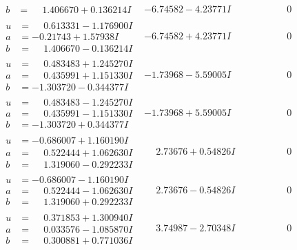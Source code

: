 \documentclass[1p]{elsarticle_modified}
\theoremstyle{definition}
\begin{document}
$$\begin{array}{c|c|c}
\begin{aligned}
b &= \phantom{-}1.406670 + 0.136214 I\end{aligned}
 & -6.74582 - 4.23771 I & \phantom{-0.000000 } 0 \\ \hline\begin{aligned}
u &= \phantom{-}0.613331 - 1.176900 I \\
a &= -0.21743 + 1.57938 I \\
b &= \phantom{-}1.406670 - 0.136214 I\end{aligned}
 & -6.74582 + 4.23771 I & \phantom{-0.000000 } 0 \\ \hline\begin{aligned}
u &= \phantom{-}0.483483 + 1.245270 I \\
a &= \phantom{-}0.435991 + 1.151330 I \\
b &= -1.303720 - 0.344377 I\end{aligned}
 & -1.73968 - 5.59005 I & \phantom{-0.000000 } 0 \\ \hline\begin{aligned}
u &= \phantom{-}0.483483 - 1.245270 I \\
a &= \phantom{-}0.435991 - 1.151330 I \\
b &= -1.303720 + 0.344377 I\end{aligned}
 & -1.73968 + 5.59005 I & \phantom{-0.000000 } 0 \\ \hline\begin{aligned}
u &= -0.686007 + 1.160190 I \\
a &= \phantom{-}0.522444 + 1.062630 I \\
b &= \phantom{-}1.319060 - 0.292233 I\end{aligned}
 & \phantom{-}2.73676 + 0.54826 I & \phantom{-0.000000 } 0 \\ \hline\begin{aligned}
u &= -0.686007 - 1.160190 I \\
a &= \phantom{-}0.522444 - 1.062630 I \\
b &= \phantom{-}1.319060 + 0.292233 I\end{aligned}
 & \phantom{-}2.73676 - 0.54826 I & \phantom{-0.000000 } 0 \\ \hline\begin{aligned}
u &= \phantom{-}0.371853 + 1.300940 I \\
a &= \phantom{-}0.033576 - 1.085870 I \\
b &= \phantom{-}0.300881 + 0.771036 I\end{aligned}
 & \phantom{-}3.74987 - 2.70348 I & \phantom{-0.000000 } 0 \\ \hline\begin{aligned}

\end{aligned}
\end{array}$$
\end{document}
